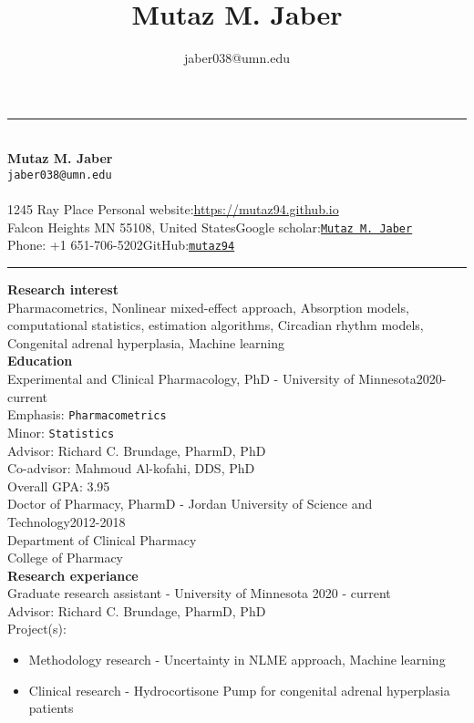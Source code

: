 \documentclass[a4paper,11pt]{article}
\title{\LARGE\bfseries Mutaz M. \textbf{Jaber}}
\author{jaber038@umn.edu}
\date{}
\begin{document}
\rule{\textwidth}{1pt}
~\\[0.5cm]
{\centering\textbf{\LARGE Mutaz M. Jaber}\\[0.1cm] \texttt{jaber038@umn.edu} \\[-0.2cm]}
~\\[0.1cm]
1245 Ray Place \hfill Personal website:\href{https://mutaz94.github.io/}{https://mutaz94.github.io}\\
Falcon Heights MN 55108, United States\hfill Google scholar:\href{https://scholar.google.com/citations?user=uugc-IgAAAAJ&hl=en&authuser=1}{\texttt{Mutaz M. Jaber}}\\
Phone: +1 651-706-5202\hfill GitHub:\href{https://github.com/Mutaz94}{\texttt{mutaz94}}\\
\rule{\textwidth}{1pt}

\textbf{Research interest}\\
Pharmacometrics, Nonlinear mixed-effect approach, Absorption models, computational statistics, estimation algorithms, Circadian rhythm models, Congenital adrenal hyperplasia, Machine learning\\

\textbf{Education}\\[-0.3cm]

Experimental and Clinical Pharmacology, PhD - University of Minnesota\hfill 2020-current\\
Emphasis: \texttt{Pharmacometrics}\\
Minor: \texttt{Statistics}\\
Advisor: Richard C. Brundage, PharmD, PhD\\
Co-advisor: Mahmoud Al-kofahi, DDS, PhD\\
Overall GPA: 3.95\\[0.5cm]

Doctor of Pharmacy, PharmD - Jordan University of Science and Technology\hfill 2012-2018\\
Department of Clinical Pharmacy\\
College of Pharmacy\\[1cm]

\textbf{Research experiance}\\[-0.3cm]


Graduate research assistant - University of Minnesota \hfill 2020 - current \\
Advisor: Richard C. Brundage, PharmD, PhD \\
Project(s): 
\begin{itemize}
\item Methodology research - Uncertainty in NLME approach, Machine learning 
\item Clinical research - Hydrocortisone Pump for congenital adrenal hyperplasia patients
\end{itemize}
\end{document}
